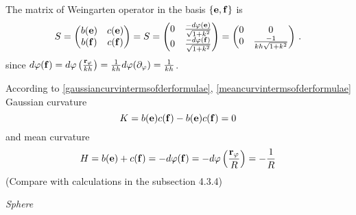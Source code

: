 \documentclass[12pt]{article}
\theoremstyle{theorem}
\numberwithin{equation}{section}
\begin{document}
  The matrix of Weingarten operator in the basis  $\{{\bf e},{\bf f}\}$ is
             $$
     S=
\begin{pmatrix}
b({\bf e})  &c({\bf e})\cr
b({\bf f})  &c({\bf f})\cr
\end{pmatrix}=
S=
\begin{pmatrix}
0  &{-d\varphi ({\bf e})\over \sqrt {1+k^2}}\cr
0  &{-d\varphi ({\bf f})\over \sqrt {1+k^2}}\cr
\end{pmatrix}=
\begin{pmatrix}
0  &0\cr
0  &{-1\over kh \sqrt {1+k^2}}\cr
\end{pmatrix}\,.
       $$
since $d\varphi({\bf f})=d\varphi\left({{\bf r}_\varphi\over kh}\right)={1\over kh}d\varphi(\partial_\varphi)={1\over kh}$.


According to \eqref{gaussiancurvintermsofderformulae}, \eqref{meancurvintermsofderformulae}
                Gaussian curvature  $$
                K=b({\bf e})c({\bf f})-b({\bf e})c({\bf f})=0
                $$
and
                mean curvature
                 $$
    H=b({\bf e})+c({\bf f})=-d\varphi({\bf f})=-d\varphi\left({{\bf r}_\varphi\over R}\right)=-{1\over R}
                 $$
  (Compare with calculations in the subsection 4.3.4)



\bigskip




{\it Sphere}


\medskip
\end{document}
